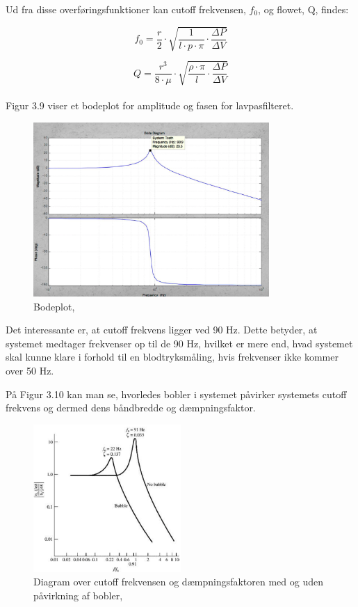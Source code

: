 Ud fra disse overføringsfunktioner kan cutoff frekvensen, $f_{0}$, og flowet, Q, findes:

\begin{equation}
f_{0} = \frac{r}{2} \cdot \sqrt{\frac{1}{l\cdot p \cdot \pi}\cdot \frac{\Delta P}{\Delta V}}
\end{equation}

\begin{equation}
Q = \frac{r^3}{8 \cdot \mu} \cdot \sqrt{\frac{\rho \cdot \pi}{l}\cdot \frac{\Delta P}{\Delta V}}
\end{equation}
 \\
 
Figur 3.9 viser et bodeplot for amplitude og fasen for lavpasfilteret.

\begin{figure}[H]
	\centering
	\includegraphics[width=0.8\textwidth]{Figurer/Snip20151207_61}
	\caption{Bodeplot, \protect\cite[slide 18]{Diashow}}
\end{figure}

Det interessante er, at cutoff frekvens ligger ved 90 Hz. Dette betyder, at systemet medtager frekvenser op til de 90 Hz, hvilket er mere end, hvad systemet skal kunne klare i forhold til en blodtryksmåling, hvis frekvenser ikke kommer over 50 Hz.


På Figur 3.10 kan man se, hvorledes bobler i systemet påvirker systemets cutoff frekvens og dermed dens båndbredde og dæmpningsfaktor.   

\begin{figure}[H]
	\centering
	\includegraphics[width=0.5\textwidth]{Figurer/Snip20151207_62}
	\caption{Diagram over cutoff frekvensen og dæmpningsfaktoren med og uden påvirkning af bobler, \protect\cite[s. 306]{Billed for invasiv blodtryksmaling}}
\end{figure}

